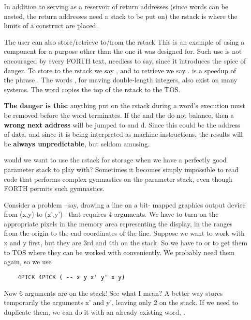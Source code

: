In addition to serving as a reservoir of return addresses (since words can be nested, the return addresses need a stack to be put on) the rstack is where the limits of a  construct are placed.

The user can also store/retrieve to/from the rstack This is an example of using a component for a purpose other than the one it was designed for. Such use is not encouraged by every FORTH text, needless to say, since it introduces the spice of danger. To store to the rstack we say , and to retrieve we say .  is a speedup of the phrase . The words  , for maving double-length integers, also exist on many systems. The word  copies the top of the rstack to the TOS.

\leftbar[1\linewidth]
\textbf{The danger is this:} anything put on the rstack during a word’s execution must be removed before the word terminates. If the  and the  do not balance, then a \textbf{wrong next address} will be jumped to and d. Since this could be the address of data, and since it is being interpreted as machine instructions, the results will be \textbf{always unpredictable}, but seldom amusing.
\endleftbar

 would we want to use the rstack for storage when we have a perfectly good parameter stack to play with? Sometimes it becomes simply impossible to read code that performs complex gymnastics on the parameter stack, even though FORTH permits such gymnastics.

Consider a problem --say, drawing a line on a bit- mapped graphics output device from (x,y) to (x',y')-- that requires 4 arguments. We have to turn on the appropriate pixels in the memory area representing the display, in the ranges from the origin to the end coordinates of the line. Suppose we want to work with x and y first, but they are 3rd and 4th on the stack. So we have to  or  to get them to TOS where they can be worked with conveniently. We probably need them again, so we use

\begin{lstlisting}
    4PICK 4PICK ( -- x y x' y' x y)
\end{lstlisting}

Now 6 arguments are on the stack! See what I mean? A better way stores temporarily the arguments x’ and y', leaving only 2 on the stack. If we need to duplicate them, we can do it with an already existing word, .

